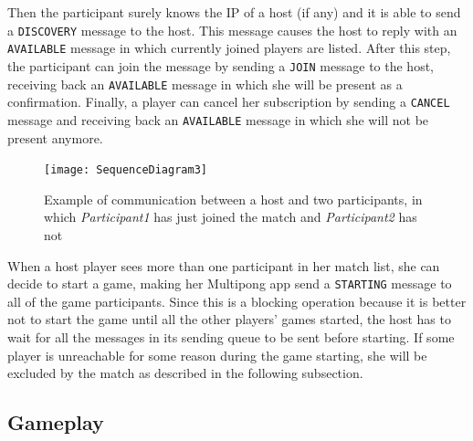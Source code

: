 Then the participant surely knows the IP of a host (if any) and it is able to
send a \texttt{DISCOVERY} message to the host. This message causes the host to
reply with an \texttt{AVAILABLE} message in which currently joined players are
listed. After this step, the participant can join the message by sending a
\texttt{JOIN} message to the host, receiving back an \texttt{AVAILABLE} message
in which she will be present as a confirmation. Finally, a player can cancel
her subscription by sending a \texttt{CANCEL} message and receiving back an
\texttt{AVAILABLE} message in which she will not be present anymore.

\begin{figure}[h]
    \centering
    \texttt{[image: SequenceDiagram3]}
    \caption{Example of communication between a host and two participants,
     in which \emph{Participant1} has just joined the match and
     \emph{Participant2} has not}
    \label{fig:seqDiagram3}
\end{figure}

When a host player sees more than one participant in her match list, she can
decide to start a game, making her Multipong app send a \texttt{STARTING}
message to all of the game participants. Since this is a blocking operation
because it is better not to start the game until all the other players' games
started, the host has to wait for all the messages in its sending queue to be
sent before starting. If some player is unreachable for some reason
during the game starting, she will be excluded by the match as described in
the following subsection.



\subsection{Gameplay}




